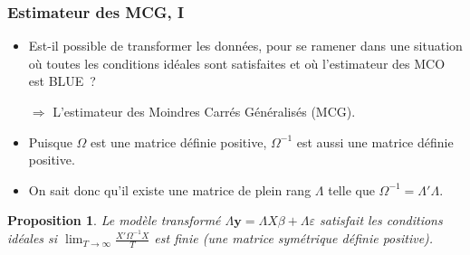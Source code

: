 \documentclass[10pt]{beamer}
\theoremstyle{plain}
\newtheorem{prop}{Proposition}
\begin{document}
\begin{frame}
  \frametitle{Estimateur des MCG, I}

  \begin{itemize}

  \item Est-il possible de transformer les données, pour se ramener dans une situation où toutes les conditions idéales sont satisfaites et où l'estimateur des MCO est BLUE~?\newline

  \item[$\Rightarrow$] L'estimateur des Moindres Carrés Généralisés (MCG).\newline

  \item Puisque $\Omega$ est une matrice définie positive, $\Omega^{-1}$ est aussi une matrice définie positive.\newline

  \item On sait donc qu'il existe une matrice de plein rang $\Lambda$ telle que $\Omega^{-1} = \Lambda'\Lambda$.\newline

  \end{itemize}


  \begin{prop}\label{prop:mcg}
    Le modèle transformé $\Lambda \mathbf y = \Lambda X \beta + \Lambda\varepsilon$ satisfait les conditions idéales si $\lim_{T\rightarrow\infty}\frac{X'\Omega^{-1}X}{T}$ est finie (une matrice symétrique définie positive).
  \end{prop}


\end{frame}
\end{document}
